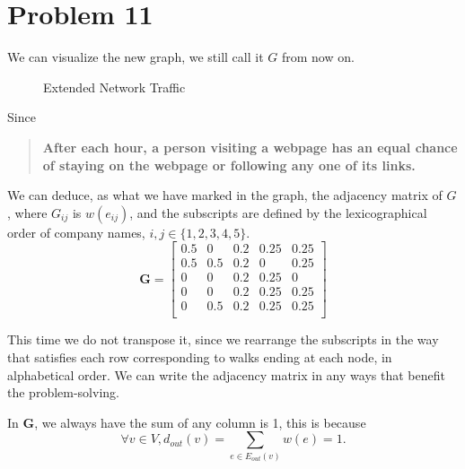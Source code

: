 \documentclass[12pt,a4paper]{article}
\newcommand{\drawV}[3]{
    \Vertex[x=#1, y=#2, size = 1, label = $#3$, fontscale = 1.5]{#3}
}
\newcommand{\drawL}[4]{
    \Edge[loopposition=#1, loopshape=#2, Direct, label = #3, fontscale = 1.2](#4)(#4)
}
\newcommand{\drawE}[4][0]{
    \Edge[Direct, bend = #1, label = #2, fontscale = 1.2](#3)(#4)
}
\begin{document}
\section*{Problem 11}
\begin{solution}
We can visualize the new graph, we still call it $G$ from now on.

\begin{figure}[H]
    \centering
    \caption{Extended Network Traffic}
    \label{fig:enter-label}
\end{figure}
Since
\begin{quote}
\textbf{After each hour, a person visiting a webpage has an equal
chance of staying on the webpage or following any one of its links.}
\end{quote}

We can deduce, as what we have marked in the graph, the adjacency matrix of $G$, where $G_{ij}$ is $w(e_{ij})$, and the subscripts are defined by the lexicographical order of company names, $i, j \in \{1, 2, 3, 4, 5\}$. 
\[
\mathbf{G} = 
\begin{bmatrix}
0.5 & 0 & 0.2 & 0.25 & 0.25 \\
0.5 & 0.5 & 0.2 & 0 & 0.25 \\
0 & 0 & 0.2 & 0.25 & 0 \\
0 & 0 & 0.2 & 0.25 & 0.25 \\
0 & 0.5 & 0.2 & 0.25 & 0.25 \\
\end{bmatrix}
\]

\begin{remark}
This time we do not transpose it, since we rearrange the subscripts in the way that satisfies each row corresponding to walks ending at each node, in alphabetical order. We can write the adjacency matrix in any ways that benefit the problem-solving. 

In $\mathbf{G}$, we always have the sum of any column is 1, this is because
\[
\forall v\in V, d_{out}(v) = \sum_{e\in E_{out}(v)} w(e) = 1.
\]
\end{remark}
\end{solution}
\end{document}
